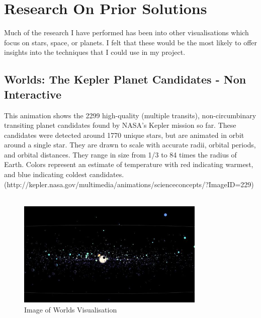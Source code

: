 \documentclass[11pt
              , a4paper
              , twoside
              , openright
              ]{report}
\begin{document}
\chapter{Research On Prior Solutions}
Much of the research I have performed has been into other visualisations which focus on stars, space, or planets. I felt that these would be the most likely to offer insights into the techniques that I could use in my project.
\section{Worlds: The Kepler Planet Candidates - Non Interactive}
This animation shows the 2299 high-quality (multiple transits), non-circumbinary transiting planet candidates found by NASA's Kepler mission so far. These candidates were detected around 1770 unique stars, but are animated in orbit around a single star. They are drawn to scale with accurate radii, orbital periods, and orbital distances. They range in size from 1/3 to 84 times the radius of Earth. Colors represent an estimate of temperature with red indicating warmest, and blue indicating coldest candidates. (http://kepler.nasa.gov/multimedia/animations/scienceconcepts/?ImageID=229)
\\\\
\begin{figure}[h!]
  \centering
      \includegraphics[width=0.8\textwidth]{images/worlds.jpg}
  \caption{Image of Worlds Visualisation}
\end{figure}
\\\\
\end{document}

